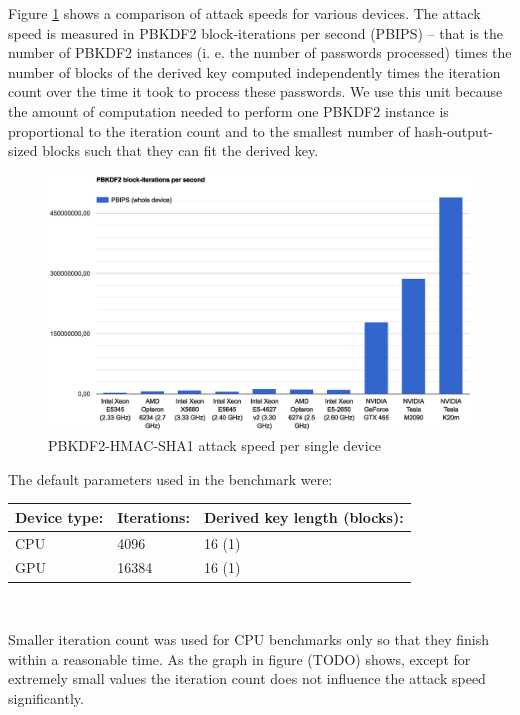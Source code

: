 \documentclass[12pt,oneside]{fithesis2}
\begin{document}
      Figure \ref{graph:devices:speed} shows a comparison of attack speeds for various devices. The attack speed is measured in PBKDF2 block-iterations per second (PBIPS) -- that is the number of PBKDF2 instances (i. e. the number of passwords processed) times the number of blocks of the derived key computed independently times the iteration count over the time it took to process these passwords. We use this unit because the amount of computation needed to perform one PBKDF2 instance is proportional to the iteration count and to the smallest number of hash-output-sized blocks such that they can fit the derived key.
      
      \begin{figure}
        \centering
        \includegraphics[width=\linewidth, clip=true, trim=3cm 1cm 2cm 3cm]{images/devices-raw-speed-whole.eps}
        \caption{PBKDF2-HMAC-SHA1 attack speed per single device}
        \label{graph:devices:speed}
      \end{figure}
      
      The default parameters used in the benchmark were:
      
      \begin{tabular}{l||l|l}
        \textbf{Device type:} & \textbf{Iterations:} & \textbf{Derived key length (blocks):} \\
        \hline \hline
        CPU & 4096  & 16 (1) \\
        GPU & 16384 & 16 (1)
      \end{tabular}
      
      ~
      
      Smaller iteration count was used for CPU benchmarks only so that they finish within a reasonable time. As the graph in figure (TODO) shows, except for extremely small values the iteration count does not influence the attack speed significantly.
      
\end{document}
